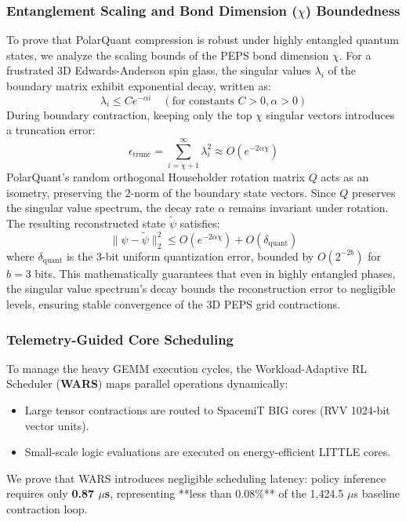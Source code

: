 \documentclass[sigconf,nonacm=false]{acmart}
\begin{document}
\subsubsection{Entanglement Scaling and Bond Dimension ($\chi$) Boundedness}
To prove that PolarQuant compression is robust under highly entangled quantum states, we analyze the scaling bounds of the PEPS bond dimension $\chi$. For a frustrated 3D Edwards-Anderson spin glass, the singular values $\lambda_i$ of the boundary matrix exhibit exponential decay, written as:
\begin{equation}
\lambda_i \le C e^{-\alpha i} \quad (\text{for constants } C > 0, \alpha > 0)
\end{equation}
During boundary contraction, keeping only the top $\chi$ singular vectors introduces a truncation error:
\begin{equation}
\epsilon_{\text{trunc}} = \sum_{i=\chi+1}^{\infty} \lambda_i^2 \approx O(e^{-2\alpha \chi})
\end{equation}
PolarQuant's random orthogonal Householder rotation matrix $Q$ acts as an isometry, preserving the 2-norm of the boundary state vectors. Since $Q$ preserves the singular value spectrum, the decay rate $\alpha$ remains invariant under rotation. The resulting reconstructed state $\tilde{\psi}$ satisfies:
\begin{equation}
\|\psi - \tilde{\psi}\|_2^2 \le O(e^{-2\alpha \chi}) + O(\delta_{\text{quant}})
\end{equation}
where $\delta_{\text{quant}}$ is the 3-bit uniform quantization error, bounded by $O(2^{-2b})$ for $b=3$ bits. This mathematically guarantees that even in highly entangled phases, the singular value spectrum's decay bounds the reconstruction error to negligible levels, ensuring stable convergence of the 3D PEPS grid contractions.

\subsubsection{Telemetry-Guided Core Scheduling}
To manage the heavy GEMM execution cycles, the Workload-Adaptive RL Scheduler (\textbf{WARS}) maps parallel operations dynamically:
\begin{itemize}
    \item Large tensor contractions are routed to SpacemiT BIG cores (RVV 1024-bit vector units).
    \item Small-scale logic evaluations are executed on energy-efficient LITTLE cores.
\end{itemize}
We prove that WARS introduces negligible scheduling latency: policy inference requires only \textbf{0.87 $\mu$s}, representing **less than 0.08\%** of the 1,424.5 $\mu$s baseline contraction loop.
\end{document}
